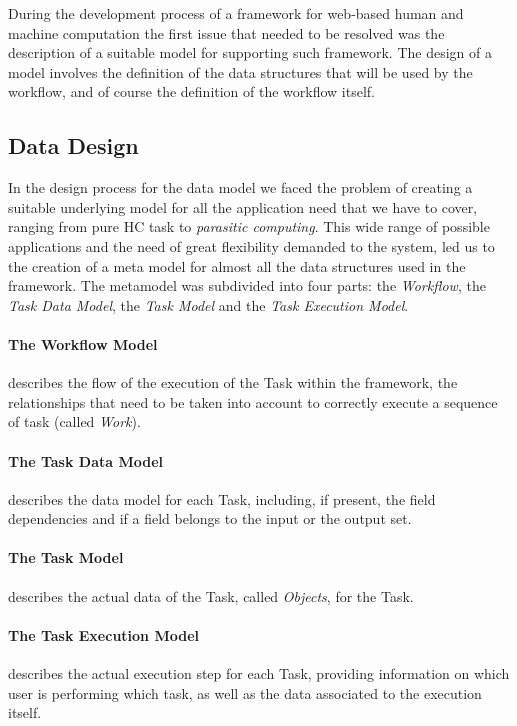During the development process of a framework for web-based human and machine
computation the first issue that needed to be
resolved was the description of a suitable model for supporting such framework.
The design of a model involves the definition of the data structures that will
be used by the workflow, and of course the definition of the workflow itself.

\subsection{Data Design}
In the design process for the data model we faced the problem of creating a
suitable underlying model for all the application need that we have to cover,
ranging from pure \acl{HC} task to \emph{parasitic computing}. This wide range
of possible applications and the need of great flexibility demanded to the system,
led us to the creation of a meta model for almost all the data structures used in
the framework. The metamodel was subdivided into four parts: the \emph{Workflow}, the
\emph{Task Data Model}, the \emph{Task Model} and the \emph{Task Execution Model}.

\paragraph{The Workflow Model} describes the flow of the execution of the Task
within the framework, the relationships that need to be taken into account to
correctly execute a sequence of task (called \emph{Work}).

\paragraph{The Task Data Model} describes the data model for each Task, including,
if present, the field dependencies and if a field belongs to the input or the
output set.

\paragraph{The Task Model} describes the actual data of the Task, called
\emph{Objects}, for the Task.

\paragraph{The Task Execution Model} describes the actual execution step for
each Task, providing information on which user is performing which task, as well
as the data associated to the execution itself.


